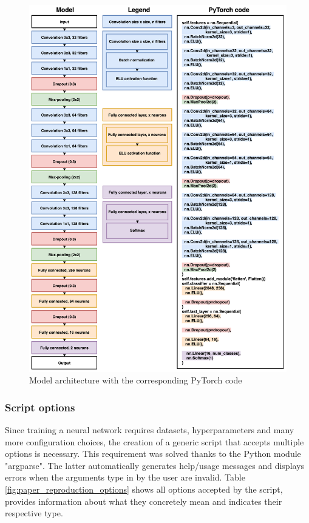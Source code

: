 \begin{figure}[!h]
\centering
\includegraphics[width=1\textwidth, keepaspectratio=true]{./figures/model_paper_manual.png}
\caption{Model architecture with the corresponding PyTorch code}
\label{fig:paper_model}
\end{figure}

\subsubsection{Script options}
Since training a neural network requires datasets, hyperparameters and many more configuration choices, the creation of a generic script that accepts multiple options is necessary. This requirement was solved thanks to the Python module "argparse". The latter automatically generates help/usage messages and displays errors when the arguments type in by the user are invalid. Table \ref{fig:paper_reproduction_options} shows all options accepted by the script, provides information about what they concretely mean and indicates their respective type.


